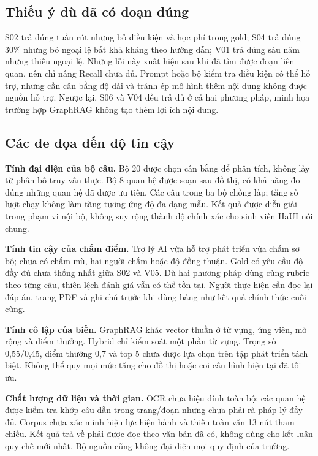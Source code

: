 \subsection{Thiếu ý dù đã có đoạn đúng}
S02 trả đúng tuần rút nhưng bỏ điều kiện và học phí trong gold; S04 trả đúng 30\% nhưng bỏ ngoại lệ bất khả kháng theo hướng dẫn; V01 trả đúng sáu năm nhưng thiếu ngoại lệ. Những lỗi này xuất hiện sau khi đã tìm được đoạn liên quan, nên chỉ nâng Recall chưa đủ. Prompt hoặc bộ kiểm tra điều kiện có thể hỗ trợ, nhưng cần cân bằng độ dài và tránh ép mô hình thêm nội dung không được nguồn hỗ trợ. Ngược lại, S06 và V04 đều trả đủ ở cả hai phương pháp, minh họa trường hợp GraphRAG không tạo thêm lợi ích nội dung.

\subsection{Các đe dọa đến độ tin cậy}
\textbf{Tính đại diện của bộ câu.} Bộ 20 được chọn cân bằng để phân tích, không lấy từ phân bố truy vấn thực. Bộ 8 quan hệ được soạn sau đồ thị, có khả năng đo đúng những quan hệ đã được ưu tiên. Các câu trong ba bộ chồng lấp; tăng số lượt chạy không làm tăng tương ứng độ đa dạng mẫu. Kết quả được diễn giải trong phạm vi nội bộ, không suy rộng thành độ chính xác cho sinh viên HaUI nói chung.

\textbf{Tính tin cậy của chấm điểm.} Trợ lý AI vừa hỗ trợ phát triển vừa chấm sơ bộ; chưa có chấm mù, hai người chấm hoặc độ đồng thuận. Gold có yêu cầu độ đầy đủ chưa thống nhất giữa S02 và V05. Dù hai phương pháp dùng cùng rubric theo từng câu, thiên lệch đánh giá vẫn có thể tồn tại. Người thực hiện cần đọc lại đáp án, trang PDF và ghi chú trước khi dùng bảng như kết quả chính thức cuối cùng.

\textbf{Tính cô lập của biến.} GraphRAG khác vector thuần ở từ vựng, ứng viên, mở rộng và điểm thưởng. Hybrid chỉ kiểm soát một phần từ vựng. Trọng số 0,55/0,45, điểm thưởng 0,7 và top 5 chưa được lựa chọn trên tập phát triển tách biệt. Không thể quy mọi mức tăng cho đồ thị hoặc coi cấu hình hiện tại đã tối ưu.

\textbf{Chất lượng dữ liệu và thời gian.} OCR chưa hiệu đính toàn bộ; các quan hệ được kiểm tra khớp câu dẫn trong trang/đoạn nhưng chưa phải rà pháp lý đầy đủ. Corpus chưa xác minh hiệu lực hiện hành và thiếu toàn văn 13 nút tham chiếu. Kết quả trả về phải được đọc theo văn bản đã có, không dùng cho kết luận quy chế mới nhất. Bộ nguồn cũng không đại diện mọi quy định của trường.


